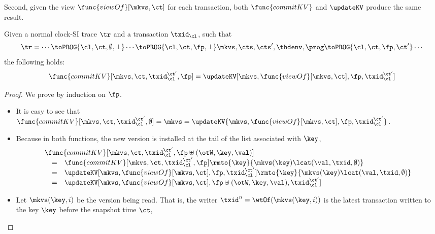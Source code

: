 Second, given the view \( \func{viewOf}[\mkvs,\ct] \) for each transaction, 
both \( \func{commitKV} \) and \( \updateKV \) produce the same result.
\begin{lemma}
    Given a normal clock-SI trace \( \tr \) and a transaction \( \txid_\cl \), such that
    \[
        \tr = \cdots \toPROG{\cl, \ct, \emptyset, \perp} \cdots \toPROG{\cl, \ct, \fp, \perp} \mkvs, \cts, \cts', \thdenv, \prog  \toPROG{\cl, \ct, \fp, \ct'} \cdots
    \] 
    the following holds:
    \[
        \func{commitKV}[\mkvs,\ct,\txid_\cl^{\ct'},\fp] = \updateKV[\mkvs, \func{viewOf}[\mkvs, \ct],\fp, \txid_\cl^{\ct'}] 
    \]
\end{lemma}
\begin{proof}
    We prove by induction on \( \fp \).
    \begin{itemize}
        \item \caseB{\( \fp = \emptyset \)}
            It is easy to see that \( \func{commitKV}[\mkvs,\ct,\txid_\cl^{\ct'},\emptyset] = \mkvs =  \updateKV{\mkvs, \func{viewOf}[\mkvs, \ct],\fp, \txid_\cl^{\ct'}} \).
        \item \caseI{\( \fp \uplus (\otW, \key, \val) \)}
            Because in both functions, the new version is installed at the tail of the list associated with \( \key \),
            \[
                \begin{array}{@{}l@{}}
                \func{commitKV}[\mkvs,\ct,\txid_\cl^{\ct'},\fp \uplus (\otW, \key, \val)]  \\
                \quad \begin{array}[t]{@{}c l@{}}
                = &
                \func{commitKV}[\mkvs,\ct,\txid_\cl^{\ct'},\fp]\rmto{\key}{\mkvs(\key) \lcat (\val, \txid, \emptyset)} \\
                = & 
                \updateKV[\mkvs,\func{viewOf}[\mkvs,\ct],\fp,\txid_\cl^{\ct'}]\rmto{\key}{\mkvs(\key) \lcat (\val, \txid, \emptyset)} \\
                = & 
                \updateKV[\mkvs,\func{viewOf}[\mkvs,\ct],\fp \uplus (\otW, \key, \val),\txid_\cl^{\ct'}]
                \end{array}
                \end{array}
            \]
        \item \caseI{\( \fp \uplus (\otR, \key, \val) \)}
            Let \( \mkvs(\key,i) \) be the version being read.
            That is, the writer \( \txid^n = \wtOf(\mkvs(\key,i)) \)
            is the latest transaction written to the key \( \key \) before the snapshot time \( \ct \),

\end{itemize}
\end{proof}
